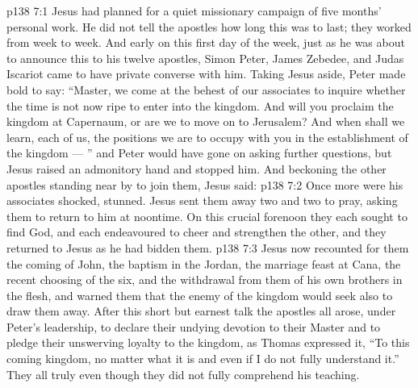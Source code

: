\vs p138 7:1 Jesus had planned for a quiet missionary campaign of five months’ personal work. He did not tell the apostles how long this was to last; they worked from week to week. And early on this first day of the week, just as he was about to announce this to his twelve apostles, Simon Peter, James Zebedee, and Judas Iscariot came to have private converse with him. Taking Jesus aside, Peter made bold to say: “Master, we come at the behest of our associates to inquire whether the time is not now ripe to enter into the kingdom. And will you proclaim the kingdom at Capernaum, or are we to move on to Jerusalem? And when shall we learn, each of us, the positions we are to occupy with you in the establishment of the kingdom --- ” and Peter would have gone on asking further questions, but Jesus raised an admonitory hand and stopped him. And beckoning the other apostles standing near by to join them, Jesus said: 
\vs p138 7:2 Once more were his associates shocked, stunned. Jesus sent them away two and two to pray, asking them to return to him at noontime. On this crucial forenoon they each sought to find God, and each endeavoured to cheer and strengthen the other, and they returned to Jesus as he had bidden them.
\vs p138 7:3 Jesus now recounted for them the coming of John, the baptism in the Jordan, the marriage feast at Cana, the recent choosing of the six, and the withdrawal from them of his own brothers in the flesh, and warned them that the enemy of the kingdom would seek also to draw them away. After this short but earnest talk the apostles all arose, under Peter’s leadership, to declare their undying devotion to their Master and to pledge their unswerving loyalty to the kingdom, as Thomas expressed it, “To this coming kingdom, no matter what it is and even if I do not fully understand it.” They all truly  even though they did not fully comprehend his teaching.
